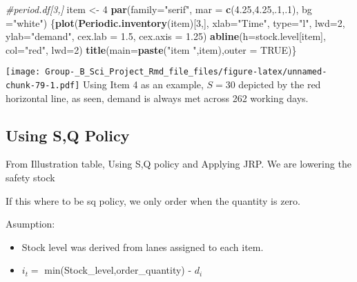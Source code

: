 \documentclass[
]{article}
\newenvironment{Shaded}{\begin{snugshade}}{\end{snugshade}}
\newcommand{\CommentTok}[1]{\textcolor[rgb]{0.56,0.35,0.01}{\textit{#1}}}
\newcommand{\DataTypeTok}[1]{\textcolor[rgb]{0.13,0.29,0.53}{#1}}
\newcommand{\DecValTok}[1]{\textcolor[rgb]{0.00,0.00,0.81}{#1}}
\newcommand{\FloatTok}[1]{\textcolor[rgb]{0.00,0.00,0.81}{#1}}
\newcommand{\KeywordTok}[1]{\textcolor[rgb]{0.13,0.29,0.53}{\textbf{#1}}}
\newcommand{\NormalTok}[1]{#1}
\newcommand{\OtherTok}[1]{\textcolor[rgb]{0.56,0.35,0.01}{#1}}
\newcommand{\StringTok}[1]{\textcolor[rgb]{0.31,0.60,0.02}{#1}}
\begin{document}
\begin{Shaded}
\begin{Highlighting}[]
\CommentTok{#period.df[3,]}
\NormalTok{item <-}\StringTok{ }\DecValTok{4}
\KeywordTok{par}\NormalTok{(}\DataTypeTok{family=}\StringTok{"serif"}\NormalTok{, }\DataTypeTok{mar =} \KeywordTok{c}\NormalTok{(}\FloatTok{4.25}\NormalTok{,}\FloatTok{4.25}\NormalTok{,.}\DecValTok{1}\NormalTok{,.}\DecValTok{1}\NormalTok{), }\DataTypeTok{bg =}\StringTok{"white"}\NormalTok{)}
\NormalTok{\{}\KeywordTok{plot}\NormalTok{(}\KeywordTok{Periodic.inventory}\NormalTok{(item)[}\DecValTok{3}\NormalTok{,], }\DataTypeTok{xlab=}\StringTok{"Time"}\NormalTok{, }\DataTypeTok{type=}\StringTok{"l"}\NormalTok{, }\DataTypeTok{lwd=}\DecValTok{2}\NormalTok{, }\DataTypeTok{ylab=}\StringTok{"demand"}\NormalTok{, }\DataTypeTok{cex.lab =} \FloatTok{1.5}\NormalTok{, }\DataTypeTok{cex.axis =} \FloatTok{1.25}\NormalTok{)}
\KeywordTok{abline}\NormalTok{(}\DataTypeTok{h=}\NormalTok{stock.level[item], }\DataTypeTok{col=}\StringTok{"red"}\NormalTok{, }\DataTypeTok{lwd=}\DecValTok{2}\NormalTok{)}
\KeywordTok{title}\NormalTok{(}\DataTypeTok{main=}\KeywordTok{paste}\NormalTok{(}\StringTok{"item "}\NormalTok{,item),}\DataTypeTok{outer =} \OtherTok{TRUE}\NormalTok{)\}}
\end{Highlighting}
\end{Shaded}

\texttt{[image: Group-\_B\_Sci\_Project\_Rmd\_file\_files/figure-latex/unnamed-chunk-79-1.pdf]}
Using Item 4 as an example, \(S=30\) depicted by the red horizontal
line, as seen, demand is always met across 262 working days.

\hypertarget{using-sq-policy}{%
\subsection{Using S,Q Policy}\label{using-sq-policy}}

From Illustration table, Using S,Q policy and Applying JRP. We are
lowering the safety stock

If this where to be sq policy, we only order when the quantity is zero.

Asumption:

\begin{itemize}
\item
  Stock level was derived from lanes assigned to each item.
\item
  \(i_t=\) min(Stock\_level,order\_quantity) - \(d_i\)
\end{itemize}
\end{document}
